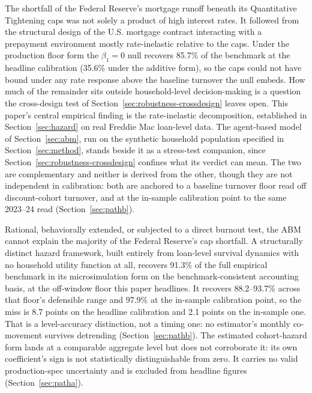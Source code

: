 \documentclass[12pt]{article}
\begin{document}
The shortfall of the Federal Reserve's mortgage runoff beneath its Quantitative Tightening caps was not solely a product of high interest rates. It followed from the structural design of the U.S. mortgage contract interacting with a prepayment environment mostly rate-inelastic relative to the caps. Under the production floor form the $\beta_1 = 0$ null recovers 85.7\% of the benchmark at the headline calibration (35.6\% under the additive form), so the caps could not have bound under any rate response above the baseline turnover the null embeds. How much of the remainder sits outside household-level decision-making is a question the cross-design test of Section~\ref{sec:robustness-crossdesign} leaves open. This paper's central empirical finding is the rate-inelastic decomposition, established in Section~\ref{sec:hazard} on real Freddie Mac loan-level data. The agent-based model of Section~\ref{sec:abm}, run on the synthetic household population specified in Section~\ref{sec:method}, stands beside it as a stress-test companion, since Section~\ref{sec:robustness-crossdesign} confines what its verdict can mean. The two are complementary and neither is derived from the other, though they are not independent in calibration: both are anchored to a baseline turnover floor read off discount-cohort turnover, and at the in-sample calibration point to the same 2023--24 read (Section~\ref{sec:pathb}).

Rational, behaviorally extended, or subjected to a direct burnout test, the ABM cannot explain the majority of the Federal Reserve's cap shortfall. A structurally distinct hazard framework, built entirely from loan-level survival dynamics with no household utility function at all, recovers 91.3\% of the full empirical benchmark in its microsimulation form on the benchmark-consistent accounting basis, at the off-window floor this paper headlines. It recovers 88.2--93.7\% across that floor's defensible range and 97.9\% at the in-sample calibration point, so the miss is 8.7 points on the headline calibration and 2.1 points on the in-sample one. That is a level-accuracy distinction, not a timing one: no estimator's monthly co-movement survives detrending (Section~\ref{sec:pathb}). The estimated cohort-hazard form lands at a comparable aggregate level but does not corroborate it: its own coefficient's sign is not statistically distinguishable from zero. It carries no valid production-spec uncertainty and is excluded from headline figures (Section~\ref{sec:patha}).
\end{document}
